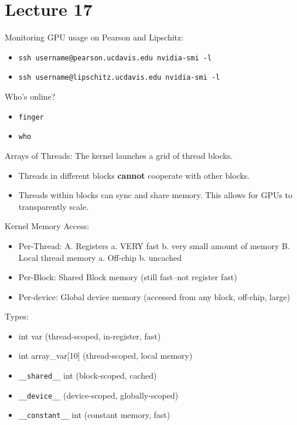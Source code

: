 \documentclass[12pt]{article}
\begin{document}
\section{Lecture 17}\label{lecture-17}

Monitoring GPU usage on Pearson and Lipschitz:

\begin{itemize}
\itemsep1pt\parskip0pt
\item
  \texttt{ssh username@pearson.ucdavis.edu nvidia-smi -l}
\item
  \texttt{ssh username@lipschitz.ucdavis.edu nvidia-smi -l}
\end{itemize}

Who's online?

\begin{itemize}
\itemsep1pt\parskip0pt
\item
  \texttt{finger}
\item
  \texttt{who}
\end{itemize}

Arrays of Threads: The kernel launches a grid of thread blocks.

\begin{itemize}
\itemsep1pt\parskip0pt
\item
  Threads in different blocks \textbf{cannot} cooperate with other
  blocks.
\item
  Threads within blocks can sync and share memory. This allows for GPUs
  to transparently scale.
\end{itemize}

Kernel Memory Access:

\begin{itemize}
\itemsep1pt\parskip0pt
\item
  Per-Thread: A. Registers a. VERY fast b. very small amount of memory
  B. Local thread memory a. Off-chip b. uncached
\item
  Per-Block: Shared Block memory (still fast--not register fast)
\item
  Per-device: Global device memory (accessed from any block, off-chip,
  large)
\end{itemize}

Types:

\begin{itemize}
\itemsep1pt\parskip0pt
\item
  int var (thread-scoped, in-register, fast)
\item
  int array\_var{[}10{]} (thread-scoped, local memory)
\item
  \texttt{\_\_shared\_\_} int (block-scoped, cached)
\item
  \texttt{\_\_device\_\_} (device-scoped, globally-scoped)
\item
  \texttt{\_\_constant\_\_} int (constant memory, fast)
\end{itemize}
\end{document}
